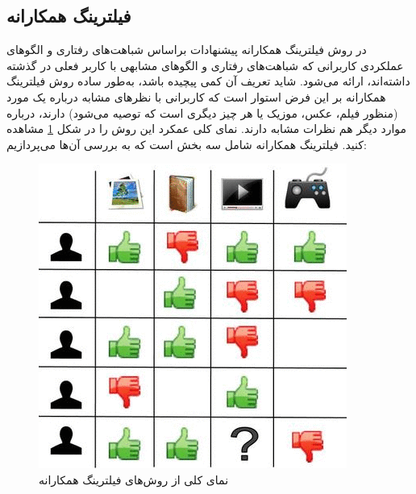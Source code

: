 \subsection{فیلترینگ همکارانه}
در روش فیلترینگ همکارانه
پیشنهادات براساس شباهت‌های رفتاری و الگوهای عملکردی کاربرانی که شباهت‌های رفتاری و الگوهای مشابهی با کاربر فعلی در گذشته داشته‌اند، ارائه می‌شود. شاید تعریف آن کمی پیچیده باشد، به‌طور ساده روش فیلترینگ همکارانه بر این فرض استوار است که کاربرانی با نظرهای مشابه درباره یک مورد (منظور فیلم، عکس، موزیک یا هر چیز دیگری است که توصیه می‌شود) دارند، درباره موارد دیگر هم نظرات مشابه دارند. نمای کلی عمکرد این روش را در شکل
\ref{recom3}
مشاهده کنید. فیلترینگ همکارانه شامل سه بخش است که به بررسی آن‌ها می‌پردازیم:
\begin{figure}
	\centering
	\includegraphics[scale=0.6]{section2/recom3.png}
	\caption{نمای کلی از روش‌های فیلترینگ همکارانه}
	\label{recom3}
\end{figure} 

